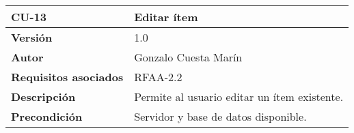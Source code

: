 \begin{longtable}[]{@{}ll@{}}
\toprule
\begin{minipage}[b]{0.15\columnwidth}\raggedright
\textbf{CU-13}\strut
\end{minipage} & \begin{minipage}[b]{0.79\columnwidth}\raggedright
\textbf{Editar ítem}\strut
\end{minipage}\tabularnewline
\midrule
\endhead
\begin{minipage}[t]{0.15\columnwidth}\raggedright
\textbf{Versión}\strut
\end{minipage} & \begin{minipage}[t]{0.79\columnwidth}\raggedright
1.0\strut
\end{minipage}\tabularnewline
\begin{minipage}[t]{0.15\columnwidth}\raggedright
\textbf{Autor}\strut
\end{minipage} & \begin{minipage}[t]{0.79\columnwidth}\raggedright
Gonzalo Cuesta Marín\strut
\end{minipage}\tabularnewline
\begin{minipage}[t]{0.15\columnwidth}\raggedright
\textbf{Requisitos asociados}\strut
\end{minipage} & \begin{minipage}[t]{0.79\columnwidth}\raggedright
RFAA-2.2\strut
\end{minipage}\tabularnewline
\begin{minipage}[t]{0.15\columnwidth}\raggedright
\textbf{Descripción}\strut
\end{minipage} & \begin{minipage}[t]{0.79\columnwidth}\raggedright
Permite al usuario editar un ítem existente.\strut
\end{minipage}\tabularnewline
\begin{minipage}[t]{0.15\columnwidth}\raggedright
\textbf{Precondición}\strut
\end{minipage} & \begin{minipage}[t]{0.79\columnwidth}\raggedright
Servidor y base de datos disponible.


\end{minipage}
\end{longtable}
